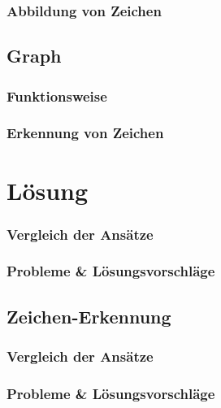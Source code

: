 \documentclass[a4paper,twopage,ngerman,11pt]{scrreprt}
\begin{document}
		\section{Abbildung von Zeichen}

		\chapter{Graph}
		\section{Funktionsweise}
		\section{Erkennung von Zeichen}

	\part{Lösung}
		
		\section{Vergleich der Ansätze}
		\section{Probleme \& Lösungsvorschläge}
		
		\chapter{Zeichen-Erkennung}
		\section{Vergleich der Ansätze}
		\section{Probleme \& Lösungsvorschläge}
		
		
\end{document}
